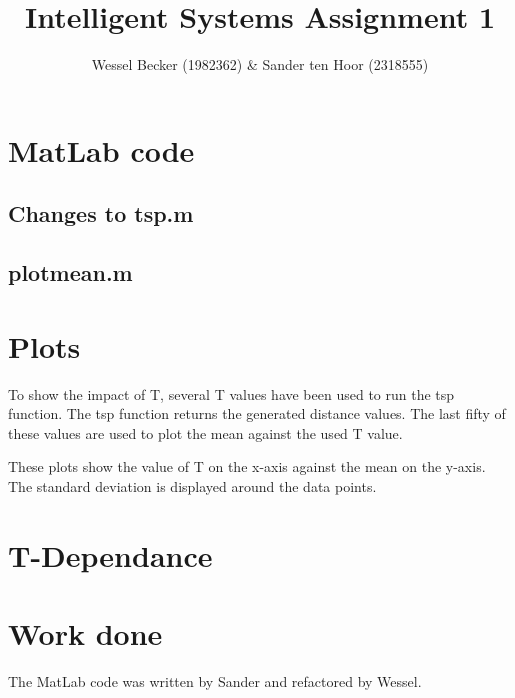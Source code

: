 \documentclass[10pt,a4paper]{article}
\begin{document}
\title{Intelligent Systems Assignment 1}
\author{Wessel Becker (1982362) \& Sander ten Hoor (2318555)}
\maketitle
\section{MatLab code}
\subsection{Changes to tsp.m}
\subsection{plotmean.m}


\section{Plots}
To show the impact of T, several T values have been used to run the tsp function. The tsp function returns the generated distance values. The last fifty of these values are used to plot the mean against the used T value.


These plots show the value of T on the x-axis against the mean on the y-axis. The standard deviation is displayed around the data points.


\section{T-Dependance}
\section{Work done}
The MatLab code was written by Sander and refactored by Wessel. 
\end{document}
